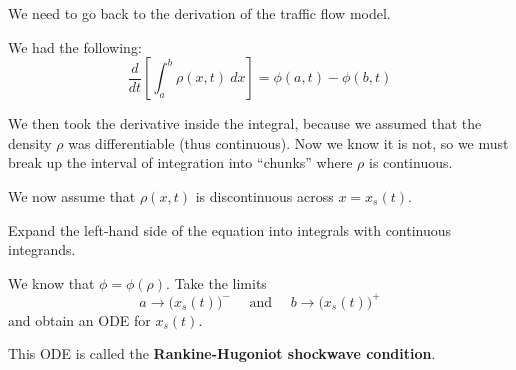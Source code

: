 \documentclass{workbook}
\begin{document}
\begin{slide}
\question
We need to go back to the derivation of the traffic flow model.

We had the following:
\[
\frac{d}{dt} \left[ \int_a^b \rho(x,t) ~dx \right] = \phi(a,t) - \phi(b,t)
\]

We then took the derivative inside the integral, because we assumed that the density $\rho$ was differentiable (thus continuous). Now we know it is not, so we must break up the interval of integration into ``chunks'' where $\rho$ is continuous.

We now assume that $\rho(x,t)$ is discontinuous across $x=x_s(t)$.

\begin{parts}
	\item Expand the left-hand side of the equation into integrals with continuous integrands.
	\item We know that $\phi = \phi(\rho)$. Take the limits
	\[ a \to \big(x_s(t)\big)^- \quad \text{ and } \quad b \to \big(x_s(t)\big)^+ \]
	and obtain an ODE for $x_s(t)$.
	
	This ODE is called the \textbf{Rankine-Hugoniot shockwave condition}.
	
\end{parts}
	
\end{slide}
\end{document}
